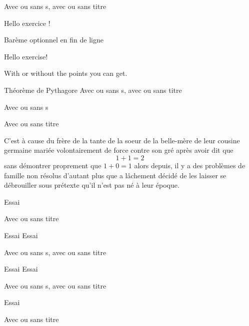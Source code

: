 \documentclass[12pt,french,oneside]{book}
\begin{document}
\begin{spacing}{1.2}
\bigskip

\begin{Methode}[]{}
Avec ou sans s, avec ou sans titre
\end{Methode}

\begin{Exercice}[(6 points)]
Hello exercice !

Barème optionnel en fin de ligne
\end{Exercice}



\begin{Exercise}[(6 points)]
Hello exercise!

With or without the points you can get.
\end{Exercise}

\begin{Exemple}[]{Théorème de Pythagore}
Avec ou sans s, avec ou sans titre
\end{Exemple}

\begin{Rmq}[s]
Avec ou sans s
\end{Rmq}

\begin{Demo}[(Titre)]
Avec ou sans titre

C'est à cause du frère de la tante de la s{oe}ur de la belle-mère de leur cousine germaine mariée volontairement de force contre son gré après avoir dit que \[1 + 1 = 2\] sans démontrer proprement que $1 + 0 = 1$ alors depuis, il y a des problèmes de famille non résolus d'autant plus que  a lâchement décidé de les laisser se débrouiller sous prétexte qu'il n'est pas né à leur époque.
\end{Demo}


\begin{Vocab}[Essai]
Essai

Avec ou sans titre
\end{Vocab}

\begin{Regle}[s]{Essai}
Essai

Avec ou sans s, avec ou sans titre
\end{Regle}

\begin{Cons}[s]{Essai}
Essai

Avec ou sans s, avec ou sans titre
\end{Cons}

\begin{Cor}[Essai]
Essai

Avec ou sans titre
\end{Cor}



\end{spacing}
\end{document}
